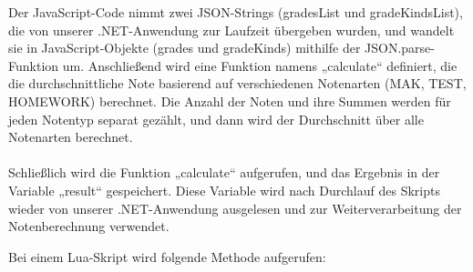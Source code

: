 Der JavaScript-Code nimmt zwei JSON-Strings (gradesList und gradeKindsList), die von unserer .NET-Anwendung 
zur Laufzeit übergeben wurden, und wandelt sie in JavaScript-Objekte (grades und gradeKinds) 
mithilfe der JSON.parse-Funktion um. Anschließend wird eine Funktion namens „calculate“ definiert, 
die die durchschnittliche Note basierend auf verschiedenen Notenarten (MAK, TEST, HOMEWORK) berechnet. 
Die Anzahl der Noten und ihre Summen werden für jeden Notentyp separat gezählt, und dann wird der 
Durchschnitt über alle Notenarten berechnet.
\\\\
Schließlich wird die Funktion „calculate“ aufgerufen, und das Ergebnis in der Variable „result“ gespeichert. 
Diese Variable wird nach Durchlauf des Skripts wieder von unserer .NET-Anwendung ausgelesen und 
zur Weiterverarbeitung der Notenberechnung verwendet.


\newpage
Bei einem Lua-Skript wird folgende Methode aufgerufen:

